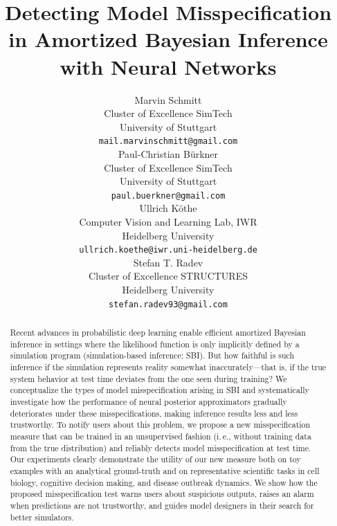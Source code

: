 \documentclass[twoside,11pt]{article}
\newcommand{\0}{\boldsymbol{0}}
\newcommand{\ie}{i.\,e.}
\begin{document}
\title{Detecting Model Misspecification in Amortized Bayesian Inference with Neural Networks}

\author{
    Marvin Schmitt\\
    Cluster of Excellence SimTech\\
    University of Stuttgart\\
    \texttt{mail.marvinschmitt@gmail.com}\\
    \And
    Paul-Christian Bürkner\\
    Cluster of Excellence SimTech\\
    University of Stuttgart\\
    \texttt{paul.buerkner@gmail.com}\\
    \And
    Ullrich Köthe\\
    Computer Vision and Learning Lab, IWR\\
    Heidelberg University\\
    \texttt{ullrich.koethe@iwr.uni-heidelberg.de}\\
    \And
    Stefan T. Radev\\
    Cluster of Excellence STRUCTURES\\
    Heidelberg University\\
    \texttt{stefan.radev93@gmail.com}
}

\maketitle

\begin{abstract}%
Recent advances in probabilistic deep learning enable efficient amortized Bayesian inference in settings where the likelihood function is only implicitly defined by a simulation program (simulation-based inference; SBI). But how faithful is such inference if the simulation represents reality somewhat inaccurately---that is, if the true system behavior at test time deviates from the one seen during training? We conceptualize the types of model misspecification arising in SBI and systematically investigate how the performance of neural posterior approximators gradually deteriorates under these misspecifications, making inference results less and less trustworthy. To notify users about this problem, we propose a new misspecification measure that can be trained in an unsupervised fashion (\ie, without training data from the true distribution) and reliably detects model misspecification at test time. Our experiments clearly demonstrate the utility of our new measure both on toy examples with an analytical ground-truth and on representative scientific tasks in cell biology, cognitive decision making, and disease outbreak dynamics. We show how the proposed misspecification test warns users about suspicious outputs, raises an alarm when predictions are not trustworthy, and guides model designers in their search for better simulators.
\end{abstract}
\end{document}
